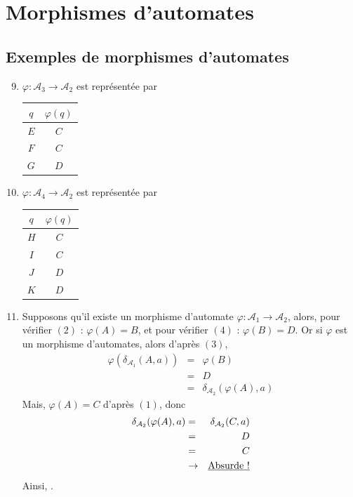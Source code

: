 \documentclass{article}
\begin{document}
\section{Morphismes d'automates}

\subsection{Exemples de morphismes d'automates}

\begin{enumerate}
    \setcounter{enumi}{8}

    \item $\varphi : \mathcal{A}_3 \rightarrow \mathcal{A}_2$ est représentée par \begin{tabular}{|c|c|}
        \hline
        $q$ & $\varphi(q)$ \\
        \hline
        $E$ & $C$ \\
        \hline
        $F$ & $C$ \\
        \hline
        $G$ & $D$ \\
        \hline
    \end{tabular}

    \item $\varphi : \mathcal{A}_4 \rightarrow \mathcal{A}_2$ est représentée par \begin{tabular}{|c|c|}
        \hline
        $q$ & $\varphi(q)$ \\
        \hline
        $H$ & $C$ \\
        \hline
        $I$ & $C$ \\
        \hline
        $J$ & $D$ \\
        \hline
        $K$ & $D$ \\
        \hline
    \end{tabular}

    \item Supposons qu'il existe un morphisme d'automate $\varphi  : \mathcal{A}_1 \rightarrow \mathcal{A}_2$, alors, pour vérifier $(2)$ : $\varphi(A) = B$, et pour vérifier $(4)$ : $\varphi(B) = D$. Or si $\varphi$ est un morphisme d'automates, alors d'après $(3)$,
    \begin{eqnarray*}
        \varphi(\delta_{\mathcal{A}_1}(A, a)) & = & \varphi(B) \\
        & = & D \\
        & = & \delta_{\mathcal{A}_2}(\varphi(A), a)
    \end{eqnarray*}
    Mais, $\varphi(A) = C$ d'après $(1)$, donc 
    \begin{eqnarray*}
        \delta_{\mathcal{A}_2}(\varphi(A), a) & = & \delta_{\mathcal{A}_2}(C, a) \\
        & = & D \\
        & = & C \\ 
        & \rightarrow & \text{\underline{Absurde !}}
    \end{eqnarray*}
    Ainsi, .


\end{enumerate}
\end{document}
